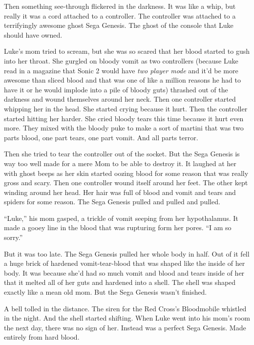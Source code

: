 Then something see-through flickered in the darkness. It was like a
whip, but really it was a cord attached to a controller. The
controller was attached to a terrifyingly awesome ghost Sega
Genesis. The ghost of the console that Luke should have
owned.



Luke's mom tried to scream, but she was so scared that her
blood started to gush into her throat. She gurgled on bloody vomit
as two controllers (because Luke read in a magazine that Sonic 2
would have {\em two player mode} and it'd be more awesome
than sliced blood and that was one of like a million reasons he had
to have it or he would implode into a pile of bloody guts) thrashed
out of the darkness and wound themselves around her neck. Then one
controller started whipping her in the head. She started crying
because it hurt. Then the controller started hitting her harder.
She cried bloody tears this time because it hurt even more. They
mixed with the bloody puke to make a sort of martini that was two
parts blood, one part tears, one part vomit. And all parts
terror.



Then she tried to tear the controller out of the socket. But the
Sega Genesis is way too well made for a mere Mom to be able to
destroy it. It laughed at her with ghost beeps as her skin started
oozing blood for some reason that was really gross and scary. Then
one controller wound itself around her feet. The other kept winding
around her head. Her hair was full of blood and vomit and tears and
spiders for some reason. The Sega Genesis pulled and pulled and
pulled.



``Luke,'' his mom gasped, a trickle of vomit seeping from
her hypothalamus. It made a gooey line in the blood that was
rupturing form her pores. ``I am so sorry.''



But it was too late. The Sega Genesis pulled her whole body in
half. Out of it fell a huge brick of hardened vomit-tear-blood that
was shaped like the inside of her body. It was because she'd
had so much vomit and blood and tears inside of her that it melted
all of her guts and hardened into a shell. The shell was shaped
exactly like a mean old mom. But the Sega Genesis wasn't
finished.



A bell tolled in the distance. The siren for the Red Cross's
Bloodmobile whistled in the night. And the shell started shifting.
When Luke went into his mom's room the next day, there was no
sign of her. Instead was a perfect Sega Genesis. Made entirely from
hard blood.



